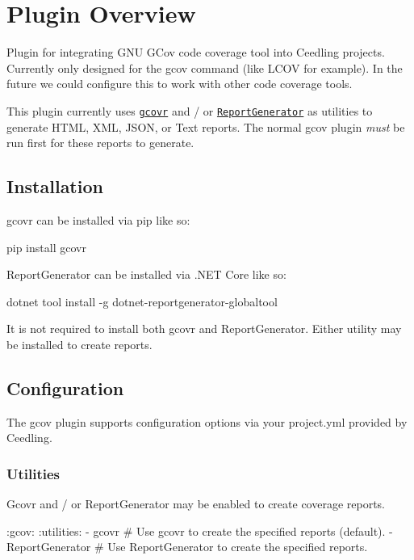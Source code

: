 \section*{Plugin Overview}

Plugin for integrating G\+NU G\+Cov code coverage tool into Ceedling projects. Currently only designed for the gcov command (like L\+C\+OV for example). In the future we could configure this to work with other code coverage tools.

This plugin currently uses \href{https://www.gcovr.com/}{\tt gcovr} and / or \href{https://danielpalme.github.io/ReportGenerator/}{\tt Report\+Generator} as utilities to generate H\+T\+ML, X\+ML, J\+S\+ON, or Text reports. The normal gcov plugin {\itshape must} be run first for these reports to generate.

\subsection*{Installation}

gcovr can be installed via pip like so\+:


\begin{DoxyCode}
pip install gcovr
\end{DoxyCode}


Report\+Generator can be installed via .N\+ET Core like so\+:


\begin{DoxyCode}
dotnet tool install -g dotnet-reportgenerator-globaltool
\end{DoxyCode}


It is not required to install both {\ttfamily gcovr} and {\ttfamily Report\+Generator}. Either utility may be installed to create reports.

\subsection*{Configuration}

The gcov plugin supports configuration options via your {\ttfamily project.\+yml} provided by Ceedling.

\subsubsection*{Utilities}

Gcovr and / or Report\+Generator may be enabled to create coverage reports.


\begin{DoxyCode}
:gcov:
  :utilities:
    - gcovr           # Use gcovr to create the specified reports (default).
    - ReportGenerator # Use ReportGenerator to create the specified reports.
\end{DoxyCode}


